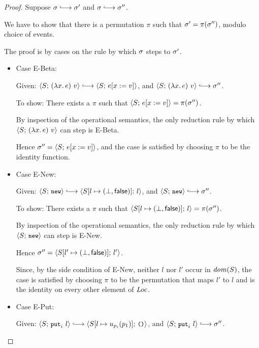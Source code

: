 \begin{proof}
  Suppose $\conf \parstepsto \conf'$ and $\conf \parstepsto \conf''$.

  We have to show that there is a permutation $\pi$ such that $\sigma'
  = \pi(\sigma'')$, modulo choice of events.

  The proof is by cases on the rule by which $\sigma$ steps to
  $\sigma'$.

  \begin{itemize}

  \item Case {\sc E-Beta}:

    Given: $\config{S}{\app{(\lam{x}{e})}{v}} \parstepsto
    \config{S}{\subst{e}{x}{v}}$, and
    $\config{S}{\app{(\lam{x}{e})}{v}} \parstepsto \conf''$.

    To show: There exists a $\pi$ such that
    $\langle S;\, e[x := v] \rangle = \pi(\sigma'')$.

    By inspection of the operational semantics, the only reduction
    rule by which $\langle S;\, (\lambda x.\,e)~v \rangle$ can step is
    {\sc E-Beta}.

    Hence $\sigma'' = \langle S;\, e[x := v] \rangle$, and the case is
    satisfied by choosing $\pi$ to be the identity function.

  \item Case {\sc E-New}:

    Given: $\config{S}{\NEW} \parstepsto
    \config{\extS{S}{l}{\bot}{\frozenfalse}}{l}$, and
    $\config{S}{\NEW} \parstepsto \conf''$.

    To show: There exists a $\pi$ such that
    $\langle S[l \mapsto (\bot, \textsf{false})];\, l \rangle = \pi(\sigma'')$.

    By inspection of the operational semantics, the only reduction
    rule by which $\langle S;\, \mbox{\small{\texttt{new}}} \rangle$ can step is {\sc E-New}.

    Hence $\sigma'' = \langle S[l' \mapsto (\bot, \textsf{false})];\, l' \rangle$.

    Since, by the side condition of {\sc E-New}, neither $l$ nor $l'$
    occur in $\mathit{dom}(S)$, the case is satisfied by choosing $\pi$ to be
    the permutation that maps $l'$ to $l$ and is the identity on every
    other element of $\mathit{Loc}$.

  \item Case {\sc E-Put}:

    Given: $\config{S}{\putiexp{l}} \parstepsto
    \config{\extSRaw{S}{l}{u_{p_i}(p_1)}}{\unit}$, and
    $\config{S}{\putiexp{l}} \parstepsto \conf''$.


\end{itemize}
\end{proof}
